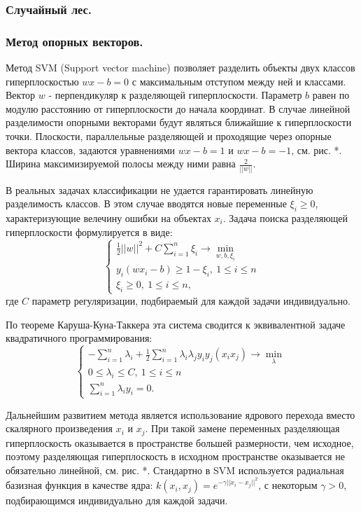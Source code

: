 \documentclass[12pt]{article}
\begin{document}
\subsubsection{Случайный лес.}


\subsubsection{Метод опорных векторов.}

\par
Метод SVM (Support vector machine) позволяет разделить объекты двух классов
гиперплоскостью $wx-b=0$ с максимальным отступом между ней и классами.
Вектор $w$ - перпендикуляр к разделяющей гиперплоскости.
Параметр $b$ равен по модулю расстоянию от гиперплоскости до начала координат.
В случае линейной разделимости опорными векторами будут являться ближайшие
к гиперплоскости точки.
Плоскости, параллельные разделяющей и проходящие через опорные вектора классов,
задаются уравнениями $wx-b=1$ и $wx-b=-1$, см. рис. {\color{red} *}.
Ширина максимизируемой полосы между ними равна $\frac{2}{||w||}.$
\par
В реальных задачах классификации не удается гарантировать линейную разделимость классов.
В этом случае вводятся новые переменные $\xi_i \ge 0$, характеризующие велечину ошибки 
на объектах $x_i$. Задача поиска разделяющей гиперплоскости формулируется в виде:
\[\begin{cases}
    \frac{1}{2}||w||^2+C\sum_{i=1}^n\xi_i \to \min_{w, b, \xi_i} \\
    y_i(wx_i-b)\ge 1-\xi_i,\ 1 \le i \le n \\
    \xi_i \ge 0,\ 1 \le i \le n,
\end{cases}\]
где $C$ параметр регуляризации, подбираемый для каждой задачи индивидуально.
\par
По теореме Каруша-Куна-Таккера эта система сводится к эквивалентной задаче
квадратичного программирования:
\[\begin{cases}
    -\sum_{i=1}^n \lambda_i + \frac{1}{2}\sum_{i=1}^n \lambda_i\lambda_j
    y_i y_j (x_i x_j) \to \min_\lambda \\
    0 \le \lambda_i \le C,\ 1 \le i \le n \\
    \sum_{i=1}^n \lambda_i y_i=0.
\end{cases}\]
\par
Дальнейшим развитием метода является использование ядрового перехода вместо
скалярного произведения $x_i$ и $x_j$. При такой замене переменных разделяющая 
гиперплоскость оказывается в пространстве большей размерности, чем исходное, поэтому
разделяющая гиперплоскость в исходном пространстве оказывается не обязательно линейной,
см. рис. {\color{red} *}. Стандартно в SVM используется радиальная базизная функция
в качестве ядра: $k(x_i, x_j)=e^{-\gamma||x_i-x_j||^2}$, с некоторым $\gamma>0$, 
подбирающимся индивидуально для каждой задачи.
\end{document}
